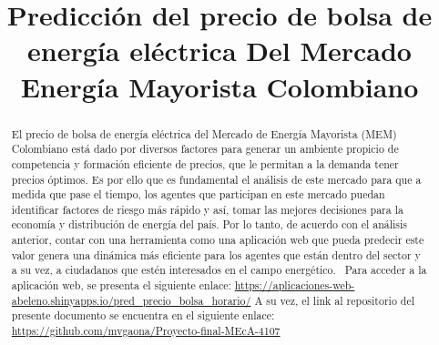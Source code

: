 \documentclass[conference, 10pt]{IEEEtran}
\begin{document}
\title{Predicción del precio de bolsa de energía eléctrica Del Mercado Energía Mayorista Colombiano}

\author{
\and
{}
}

\maketitle

\begin{abstract}
El precio de bolsa de energía eléctrica del Mercado de Energía Mayorista (MEM) Colombiano está dado por diversos factores para generar un ambiente propicio de competencia y formación eficiente de precios, que le permitan a la demanda tener precios óptimos. Es por ello que es fundamental el análisis  de este mercado para que a medida que pase el tiempo, los agentes que participan en este mercado puedan identificar factores de riesgo más rápido y así, tomar las mejores decisiones para la economía y distribución de energía del país. Por lo tanto, de acuerdo con el análisis anterior, contar con una herramienta como una aplicación web que pueda predecir este valor genera una dinámica más eficiente para los agentes que están dentro del sector y a su vez, a ciudadanos que estén interesados en el campo energético. \
Para acceder a la aplicación web, se presenta el siguiente enlace: \url{https://aplicaciones-web-abeleno.shinyapps.io/pred_precio_bolsa_horario/} A su vez, el link al  repositorio del presente documento se encuentra en el siguiente enlace: \url{https://github.com/mvgaona/Proyecto-final-MEcA-4107}
\end{abstract}
\end{document}
